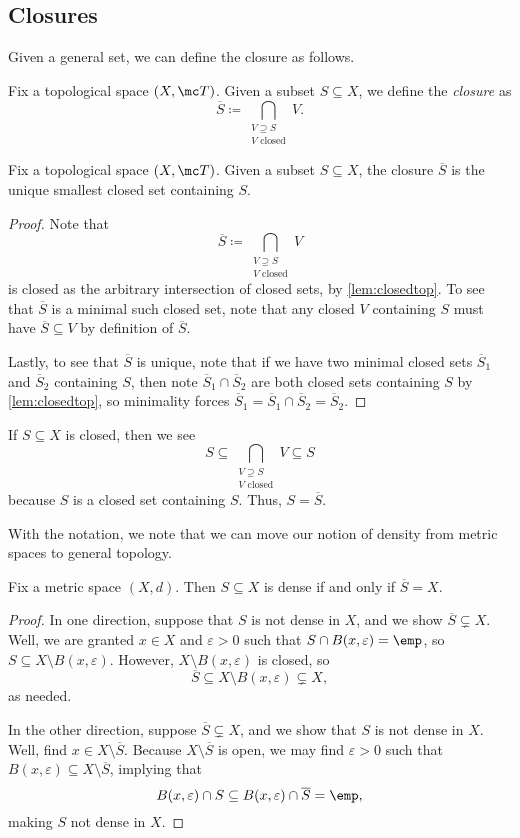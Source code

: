 \documentclass[../notes.tex]{subfiles}
\begin{document}
\subsection{Closures}
Given a general set, we can define the closure as follows.
\begin{definition}[Closure]
	Fix a topological space $(X,\mc T)$. Given a subset $S\subseteq X$, we define the \textit{closure} as
	\[\overline S\coloneqq\bigcap_{\substack{V\supseteq S\\V\text{ closed}}}V.\]
\end{definition}
\begin{lemma}
	Fix a topological space $(X,\mc T)$. Given a subset $S\subseteq X$, the closure $\overline S$ is the unique smallest closed set containing $S$.
\end{lemma}
\begin{proof}
	Note that
	\[\overline S\coloneqq\bigcap_{\substack{V\supseteq S\\V\text{ closed}}}V\]
	is closed as the arbitrary intersection of closed sets, by \autoref{lem:closedtop}. To see that $\overline S$ is a minimal such closed set, note that any closed $V$ containing $S$ must have $\overline S\subseteq V$ by definition of $\overline S$.
	
	Lastly, to see that $\overline S$ is unique, note that if we have two minimal closed sets $\overline S_1$ and $\overline S_2$ containing $S$, then note $\overline S_1\cap\overline S_2$ are both closed sets containing $S$ by \autoref{lem:closedtop}, so minimality forces $\overline S_1=\overline S_1\cap\overline S_2=\overline S_2$.
\end{proof}
\begin{example} \label{ex:closureofclosed}
	If $S\subseteq X$ is closed, then we see
	\[S\subseteq\bigcap_{\substack{V\supseteq S\\V\text{ closed}}}V\subseteq S\]
	because $S$ is a closed set containing $S$. Thus, $S=\overline S$.
\end{example}
With the notation, we note that we can move our notion of density from metric spaces to general topology.
\begin{lemma}
	Fix a metric space $(X,d)$. Then $S\subseteq X$ is dense if and only if $\overline S=X$.
\end{lemma}
\begin{proof}
	In one direction, suppose that $S$ is not dense in $X$, and we show $\overline S\subsetneq X$. Well, we are granted $x\in X$ and $\varepsilon>0$ such that $S\cap B(x,\varepsilon)=\emp$, so $S\subseteq X\setminus B(x,\varepsilon)$. However, $X\setminus B(x,\varepsilon)$ is closed, so
	\[\overline S\subseteq X\setminus B(x,\varepsilon)\subsetneq X,\]
	as needed.

	In the other direction, suppose $\overline S\subsetneq X$, and we show that $S$ is not dense in $X$. Well, find $x\in X\setminus\overline S$. Because $X\setminus\overline S$ is open, we may find $\varepsilon>0$ such that $B(x,\varepsilon)\subseteq X\setminus\overline S$, implying that
	\[B(x,\varepsilon)\cap S\subseteq B(x,\varepsilon)\cap\overline S=\emp,\]
	making $S$ not dense in $X$.
\end{proof}
\end{document}
